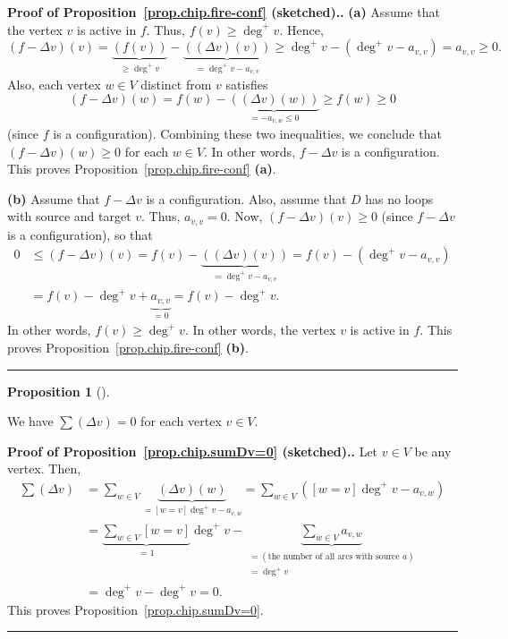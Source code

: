 \documentclass[numbers=enddot,12pt,final,onecolumn,notitlepage]{scrartcl}%
\theoremstyle{definition}
\newtheorem{prop}[theo]{Proposition}
\newenvironment{proposition}[1][]
{\begin{prop}[#1]\begin{leftbar}}
{\end{leftbar}\end{prop}}
\newenvironment{proof}[1][Proof]{\noindent\textbf{#1.} }{\ \rule{0.5em}{0.5em}}
\let\sumnonlimits\sum
\renewcommand{\sum}{\sumnonlimits\limits}
\newcommand{\tup}[1]{\left( #1 \right)}
\begin{document}
\begin{proof}[Proof of Proposition~\ref{prop.chip.fire-conf} (sketched).]
\textbf{(a)} Assume that the vertex $v$ is active in $f$.
Thus, $f \tup{v} \geq \deg^+ v$.
Hence,
\[
\tup{f - \Delta v} \tup{v}
= \underbrace{\tup{ f \tup{v} }}_{\geq \deg^+ v}
  - \underbrace{\tup{ \tup{\Delta v} \tup{v} }}_{= \deg^+ v - a_{v, v} }
\geq \deg^+ v - \tup{\deg^+ v - a_{v, v}} = a_{v, v} \geq 0 .
\]
Also, each vertex $w \in V$ distinct from $v$ satisfies
\[
\tup{f - \Delta v} \tup{w}
= f \tup{w}
  - \underbrace{\tup{ \tup{\Delta v} \tup{w} }}_{= - a_{v, w} \leq 0 }
\geq f \tup{w} \geq 0
\]
(since $f$ is a configuration).
Combining these two inequalities, we conclude that
$\tup{f - \Delta v} \tup{w} \geq 0$
for each $w \in V$.
In other words, $f - \Delta v$ is a configuration.
This proves Proposition~\ref{prop.chip.fire-conf} \textbf{(a)}.

\textbf{(b)} Assume that $f - \Delta v$ is a configuration.
Also, assume that $D$ has no loops with source and target $v$.
Thus, $a_{v, v} = 0$.
Now, $\tup{f - \Delta v} \tup{v} \geq 0$ (since
$f - \Delta v$ is a configuration), so that
\begin{align*}
0 &\leq \tup{f - \Delta v} \tup{v}
= f \tup{v}
  - \underbrace{\tup{ \tup{\Delta v} \tup{v} }}_{= \deg^+ v - a_{v, v} }
= f \tup{v} - \tup{\deg^+ v - a_{v, v}} \\
&= f \tup{v} - \deg^+ v + \underbrace{a_{v, v}}_{= 0}
= f \tup{v} - \deg^+ v .
\end{align*}
In other words, $f \tup{v} \geq \deg^+ v$. In other words,
the vertex $v$ is active in $f$.
This proves Proposition~\ref{prop.chip.fire-conf} \textbf{(b)}.
\end{proof}

\begin{proposition} \label{prop.chip.sumDv=0}
We have $\sum \tup{\Delta v} = 0$ for each vertex $v \in V$.
\end{proposition}

\begin{proof}[Proof of Proposition~\ref{prop.chip.sumDv=0} (sketched).]
Let $v\in V$ be any vertex. Then,
\begin{align*}
\sum\left(  \Delta v\right)    & =\sum_{w\in V}\underbrace{\left(  \Delta
v\right)  \left(  w\right)  }_{=\left[  w=v\right]  \deg^{+}v-a_{v,w}}%
=\sum_{w\in V}\left(  \left[  w=v\right]  \deg^{+}v-a_{v,w}\right)  \\
& =\underbrace{\sum_{w\in V}\left[  w=v\right]  }_{=1}\deg^{+}%
v-\underbrace{\sum_{w\in V}a_{v,w}}_{\substack{=\left(  \text{the number of
all arcs with source }a\right)  \\=\deg^{+}v}}\\
& =\deg^{+}v-\deg^{+}v=0.
\end{align*}
This proves Proposition~\ref{prop.chip.sumDv=0}.
\end{proof}
\end{document}
